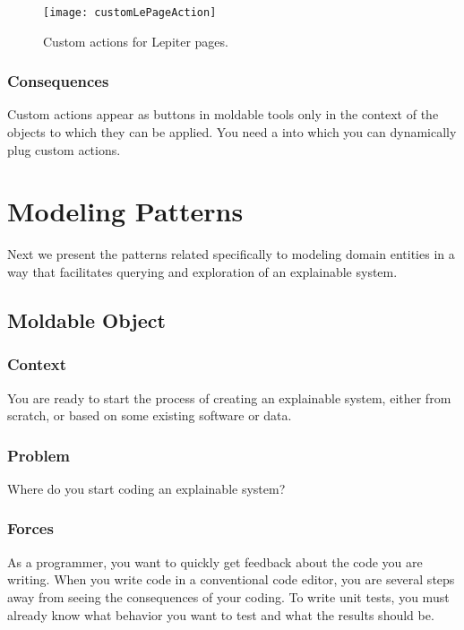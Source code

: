 \documentclass[sigconf]{acmart}
\newcommand{\pattern}[1]{\emph{\nameref{pat:#1}}\xspace}
\begin{document}
\begin{figure}[h]
  \texttt{[image: customLePageAction]}
  \caption{Custom actions for Lepiter pages.}
  \label{fig:customLePageAction}
\end{figure}

\subsubsection*{Consequences}
Custom actions appear as buttons in moldable tools only in the context of the objects to which they can be applied.
You need a \pattern{moldableTool} into which you can dynamically plug custom actions.

\section{Modeling Patterns}\label{sec:modeling}

Next we present the patterns related specifically to modeling domain entities in a way that facilitates querying and exploration of an explainable system.

\subsection*{Moldable Object}\label{pat:moldableObject}

\subsubsection*{Context}
You are ready to start the process of creating an explainable system, either from scratch, or based on some existing software or data.

\subsubsection*{Problem}
Where do you start coding an explainable system?

\subsubsection*{Forces}
As a programmer, you want to quickly get feedback about the code you are writing.
When you write code in a conventional code editor, you are several steps away from seeing the consequences of your coding.
To write unit tests, you must already know what behavior you want to test and what the results should be.
\end{document}
